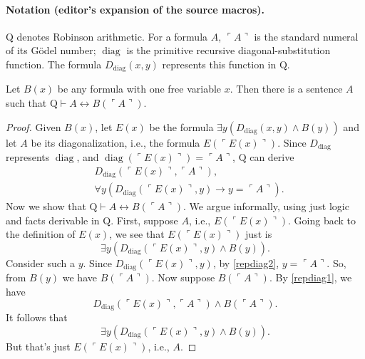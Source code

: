 
\paragraph{Notation (editor's expansion of the source macros).}
$\mathrm Q$ denotes Robinson arithmetic. For a formula $A$, $\ulcorner A\urcorner$ is the standard numeral of its G\"odel number; $\operatorname{diag}$ is the primitive recursive diagonal-substitution function. The formula $D_{\operatorname{diag}}(x,y)$ represents this function in $\mathrm Q$.
\begin{lemma}
Let $B(x)$ be any formula with one free variable $x$. Then there is a sentence $A$ such that $\mathrm Q\vdash A\leftrightarrow B(\ulcorner A\urcorner)$.
\end{lemma}
\begin{proof}
Given $B(x)$, let $E(x)$ be the formula $\exists y(D_{\operatorname{diag}}(x,y)\land B(y))$ and let $A$ be its diagonalization, i.e., the formula $E(\ulcorner E(x)\urcorner)$.
Since $D_{\operatorname{diag}}$ represents $\operatorname{diag}$, and $\operatorname{diag}(\ulcorner E(x)\urcorner)=\ulcorner A\urcorner$, $\mathrm Q$ can derive
\begin{align}
&D_{\operatorname{diag}}(\ulcorner E(x)\urcorner,\ulcorner A\urcorner),\label{repdiag1}\\
&\forall y(D_{\operatorname{diag}}(\ulcorner E(x)\urcorner,y)\to y=\ulcorner A\urcorner).\label{repdiag2}
\end{align}
Now we show that $\mathrm Q\vdash A\leftrightarrow B(\ulcorner A\urcorner)$. We argue informally, using just logic and facts derivable in $\mathrm Q$.
First, suppose $A$, i.e., $E(\ulcorner E(x)\urcorner)$. Going back to the definition of $E(x)$, we see that $E(\ulcorner E(x)\urcorner)$ just is
\[\exists y(D_{\operatorname{diag}}(\ulcorner E(x)\urcorner,y)\land B(y)).\]
Consider such a $y$. Since $D_{\operatorname{diag}}(\ulcorner E(x)\urcorner,y)$, by \eqref{repdiag2}, $y=\ulcorner A\urcorner$. So, from $B(y)$ we have $B(\ulcorner A\urcorner)$.
Now suppose $B(\ulcorner A\urcorner)$. By \eqref{repdiag1}, we have
\[D_{\operatorname{diag}}(\ulcorner E(x)\urcorner,\ulcorner A\urcorner)\land B(\ulcorner A\urcorner).\]
It follows that
\[\exists y(D_{\operatorname{diag}}(\ulcorner E(x)\urcorner,y)\land B(y)).\]
But that's just $E(\ulcorner E(x)\urcorner)$, i.e., $A$.
\end{proof}

